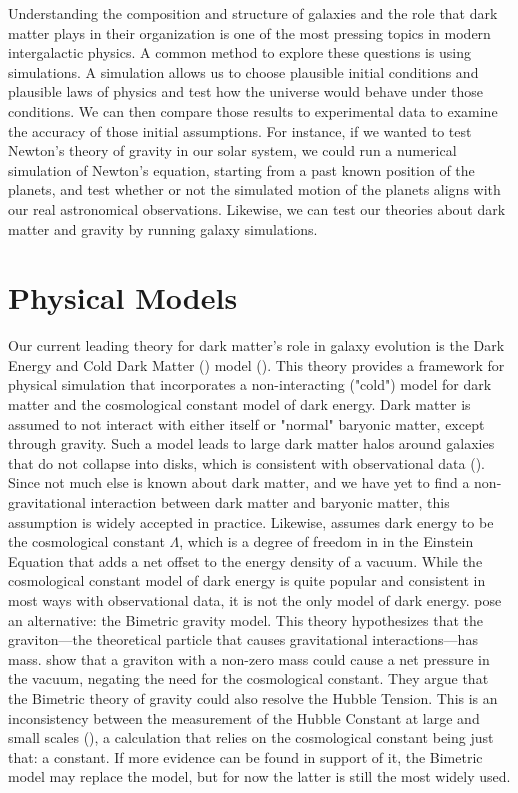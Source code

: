
Understanding the composition and structure of galaxies and the role that dark matter plays in their organization is one of the most pressing topics in modern intergalactic physics. A common method to explore these questions is using simulations. A simulation allows us to choose plausible initial conditions and plausible laws of physics and test how the universe would behave under those conditions. We can then compare those results to experimental data to examine the accuracy of those initial assumptions. For instance, if we wanted to test Newton's theory of gravity in our solar system, we could run a numerical simulation of Newton's equation, starting from a past known position of the planets, and test whether or not the simulated motion of the planets aligns with our real astronomical observations. Likewise, we can test our theories about dark matter and gravity by running galaxy simulations.

\section{Physical Models}

Our current leading theory for dark matter's role in galaxy evolution is the Dark Energy and Cold Dark Matter (\lcdm) model (\cite{salesBaryonicSolutionsChallenges2022}). This theory provides a framework for physical simulation that incorporates a non-interacting ("cold") model for dark matter and the cosmological constant model of dark energy. Dark matter is assumed to not interact with either itself or "normal" baryonic matter, except through gravity. Such a model leads to large dark matter halos around galaxies that do not collapse into disks, which is consistent with observational data (\cite{feldmannFIREboxSimulatingGalaxies2022}). Since not much else is known about dark matter, and we have yet to find a non-gravitational interaction between dark matter and baryonic matter, this assumption is widely accepted in practice. Likewise, \cite{feldmannFIREboxSimulatingGalaxies2022} assumes dark energy to be the cosmological constant $\Lambda$, which is a degree of freedom in in the Einstein Equation that adds a net offset to the energy density of a vacuum. While the cosmological constant model of dark energy is quite popular and consistent in most ways with observational data, it is not the only model of dark energy. \cite{bassiCosmologicalEvolutionBimetric2023} pose an alternative: the Bimetric gravity model. This theory hypothesizes that the graviton---the theoretical particle that causes gravitational interactions---has mass. \cite{bassiCosmologicalEvolutionBimetric2023} show that a graviton with a non-zero mass could cause a net pressure in the vacuum, negating the need for the cosmological constant. They argue that the Bimetric theory of gravity could also resolve the Hubble Tension. This is an inconsistency between the measurement of the Hubble Constant at large and small scales (\cite{senCosmologicalObservationsAllow2022}), a calculation that relies on the cosmological constant being just that: a constant. If more evidence can be found in support of it, the Bimetric model may replace the \lcdm\space model, but for now the latter is still the most widely used.

